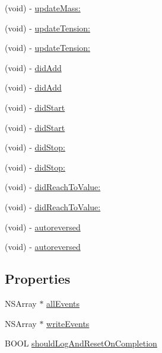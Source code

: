 \begin{DoxyCompactItemize}
\item 
(void) -\/ \mbox{\hyperlink{interface_p_o_p_animation_tracer_a1e41c2f1b7c5332730d2c834e0420367}{update\+Mass\+:}}
\item 
(void) -\/ \mbox{\hyperlink{interface_p_o_p_animation_tracer_a5010bbc6fa2ec5426d33706651e584de}{update\+Tension\+:}}
\item 
(void) -\/ \mbox{\hyperlink{interface_p_o_p_animation_tracer_a5010bbc6fa2ec5426d33706651e584de}{update\+Tension\+:}}
\item 
(void) -\/ \mbox{\hyperlink{interface_p_o_p_animation_tracer_ad853415c050d51eea5ca62c154e9e94a}{did\+Add}}
\item 
(void) -\/ \mbox{\hyperlink{interface_p_o_p_animation_tracer_ad853415c050d51eea5ca62c154e9e94a}{did\+Add}}
\item 
(void) -\/ \mbox{\hyperlink{interface_p_o_p_animation_tracer_a91b472c0e05c912fe9d05e2e9de17f9f}{did\+Start}}
\item 
(void) -\/ \mbox{\hyperlink{interface_p_o_p_animation_tracer_a91b472c0e05c912fe9d05e2e9de17f9f}{did\+Start}}
\item 
(void) -\/ \mbox{\hyperlink{interface_p_o_p_animation_tracer_aa97d51350238303c671157f782583a9b}{did\+Stop\+:}}
\item 
(void) -\/ \mbox{\hyperlink{interface_p_o_p_animation_tracer_aa97d51350238303c671157f782583a9b}{did\+Stop\+:}}
\item 
(void) -\/ \mbox{\hyperlink{interface_p_o_p_animation_tracer_a03287c5af7d17de6143c7dcc0ac56251}{did\+Reach\+To\+Value\+:}}
\item 
(void) -\/ \mbox{\hyperlink{interface_p_o_p_animation_tracer_a03287c5af7d17de6143c7dcc0ac56251}{did\+Reach\+To\+Value\+:}}
\item 
(void) -\/ \mbox{\hyperlink{interface_p_o_p_animation_tracer_a641c94b868612f3d5b92b24cc4098517}{autoreversed}}
\item 
(void) -\/ \mbox{\hyperlink{interface_p_o_p_animation_tracer_a641c94b868612f3d5b92b24cc4098517}{autoreversed}}
\end{DoxyCompactItemize}
\subsection*{Properties}
\begin{DoxyCompactItemize}
\item 
N\+S\+Array $\ast$ \mbox{\hyperlink{interface_p_o_p_animation_tracer_a2cdf7bf33c46077a8d22c300571d2779}{all\+Events}}
\item 
N\+S\+Array $\ast$ \mbox{\hyperlink{interface_p_o_p_animation_tracer_a060229dcdf09988de4221e4b82a65dc1}{write\+Events}}
\item 
B\+O\+OL \mbox{\hyperlink{interface_p_o_p_animation_tracer_ae988e06b77d323a6fe299da1d0b78d44}{should\+Log\+And\+Reset\+On\+Completion}}
\end{DoxyCompactItemize}


